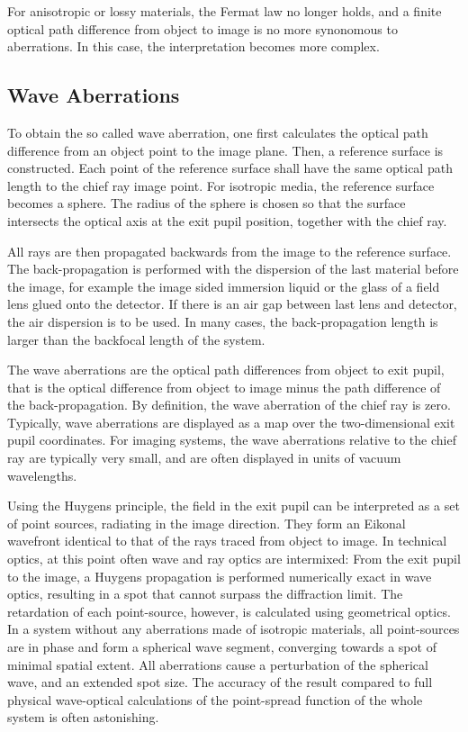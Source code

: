 \documentclass[12pt,a4paper,twoside,openright,BCOR10mm,headsepline,titlepage,abstracton,chapterprefix,final]{scrreprt}
\begin{document}
For anisotropic or lossy materials, the Fermat law no longer holds, and a finite optical path difference from object to image is no more synonomous to aberrations.
In this case, the interpretation becomes more complex.

\subsection{Wave Aberrations}
To obtain the so called wave aberration, one first calculates the optical path difference from an object point to the image plane.
Then, a reference surface is constructed. 
Each point of the reference surface shall have the same optical path length to the chief ray image point.
For isotropic media, the reference surface becomes a sphere.
The radius of the sphere is chosen so that the surface intersects the optical axis at the exit pupil position, together with the chief ray.

All rays are then propagated backwards from the image to the reference surface.
The back-propagation is performed with the dispersion of the last material before the image, 
for example the image sided immersion liquid or the glass of a field lens glued onto the detector.
If there is an air gap between last lens and detector, the air dispersion is to be used.
In many cases, the back-propagation length is larger than the backfocal length of the system.

The wave aberrations are the optical path differences from object to exit pupil, 
that is the optical difference from object to image minus the path difference of the back-propagation.
By definition, the wave aberration of the chief ray is zero.
Typically, wave aberrations are displayed as a map over the two-dimensional exit pupil coordinates.
For imaging systems, the wave aberrations relative to the chief ray are typically very small, and are often displayed in units of vacuum wavelengths.

Using the Huygens principle, the field in the exit pupil can be interpreted as a set of point sources, radiating in the image direction. 
They form an Eikonal wavefront identical to that of the rays traced from object to image.
In technical optics, at this point often wave and ray optics are intermixed:
From the exit pupil to the image, a Huygens propagation is performed numerically exact in wave optics, resulting in a spot that cannot surpass the diffraction limit. 
The retardation of each point-source, however, is calculated using geometrical optics.
In a system without any aberrations made of isotropic materials, all point-sources are in phase and form a spherical wave segment, converging towards a spot of minimal spatial extent.
All aberrations cause a perturbation of the spherical wave, and an extended spot size.
The accuracy of the result compared to full physical wave-optical calculations of the point-spread function of the whole system is often astonishing. 
\end{document}
